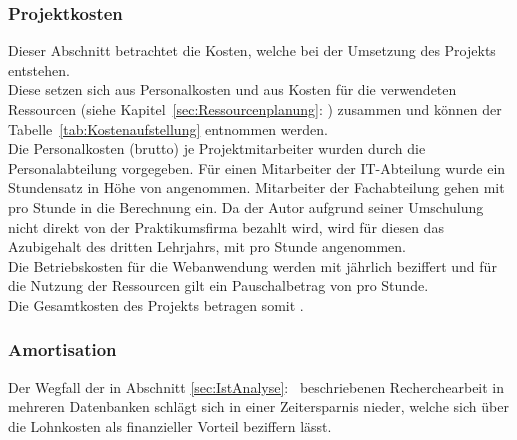 \subsubsection{Projektkosten}
\label{sec:Projektkosten}
Dieser Abschnitt betrachtet die Kosten, welche bei der Umsetzung des Projekts entstehen.\\ 
Diese setzen sich aus Personalkosten und aus Kosten für die verwendeten Ressourcen
(siehe Kapitel~\ref{sec:Ressourcenplanung}: ) zusammen und 
können der Tabelle~\ref{tab:Kostenaufstellung} entnommen werden.\\
Die Personalkosten (brutto) je Projektmitarbeiter wurden durch die Personalabteilung vorgegeben. 
Für einen Mitarbeiter der IT-Abteilung wurde ein Stundensatz in Höhe von  angenommen. Mitarbeiter
der Fachabteilung gehen mit  pro Stunde in die Berechnung ein. Da der Autor aufgrund seiner Umschulung
nicht direkt von der Praktikumsfirma bezahlt wird, wird für diesen das Azubigehalt des dritten Lehrjahrs,
mit  pro Stunde angenommen.\\
Die Betriebskosten für die Webanwendung werden mit jährlich  beziffert und für die Nutzung der Ressourcen 
gilt ein Pauschalbetrag von  pro Stunde. \\
Die Gesamtkosten des Projekts betragen somit . 



\subsubsection{Amortisation}
\label{sec:Amortisations}
Der Wegfall der in Abschnitt \ref{sec:IstAnalyse}:~ beschriebenen Recherchearbeit in mehreren 
Datenbanken schlägt sich in einer Zeitersparnis nieder, welche sich \ua über die Lohnkosten als finanzieller Vorteil beziffern lässt.\\

